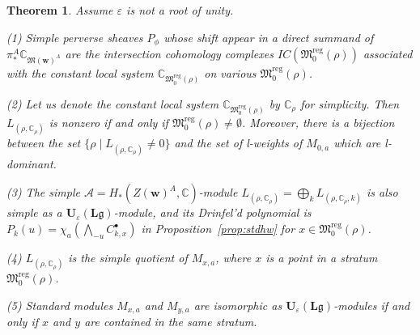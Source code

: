\documentclass[12pt]{amsart}
\def\Bbb{\mathbb}
\def\frak{\mathfrak}
\newcommand{\rom}{\textup}
\newtheorem{Theorem}[equation]{Theorem}
\theoremstyle{definition}
\theoremstyle{remark}
\numberwithin{equation}{subsection}
\newcommand{\propref}[1]{Proposition~\ref{#1}}
\newcommand{\C}{{\Bbb C}}
\newcommand{\M}{{\frak M}} %
\newcommand{\Mreg}{{\frak M_0^{\operatorname{reg}}}}
\newcommand{\bw}{{\mathbf w}} %
\newcommand{\Ule}{{\mathbf U}_{\varepsilon}({\mathbf L}\mathfrak g)}
\newcommand{\Wedge}{{\textstyle \bigwedge}}
\begin{document}
\begin{Theorem}\label{thm:std_decomp}
Assume $\varepsilon$ is not a root of unity.

\rom{(1)} Simple perverse sheaves $P_{\phi}$ whose shift appear in a
direct summand of $\pi^A_*\C_{\M(\bw)^A}$ are the intersection
cohomology complexes $IC(\Mreg(\rho))$
associated with the constant local system $\C_{\Mreg(\rho)}$ on various
$\Mreg(\rho)$.

\rom{(2)} Let us denote the constant local system $\C_{\Mreg(\rho)}$
by $\C_\rho$ for simplicity.
Then $L_{(\rho,\C_\rho)}$ is nonzero if and only if
$\Mreg(\rho)\neq\emptyset$. Moreover, there is a bijection between
%
the set $\{\rho\mid L_{(\rho,\C_{\rho})}\neq 0\}$
and
%
the set of {\it l\/}-weights of $M_{0,a}$ which are {\it l\/}-dominant.

\rom{(3)} The simple $\mathcal A = H_*(Z(\bw)^A,\C)$-module 
$L_{(\rho,\C_\rho)} = \bigoplus_k L_{(\rho,\C_\rho,k)}$
is also simple as a $\Ule$-module, and its Drinfel'd
polynomial is
$P_k(u) = \chi_a\left(\Wedge_{-u} C_{k,x}^\bullet\right)$
in \propref{prop:stdhw} for $x\in \Mreg(\rho)$.

\rom{(4)} $L_{(\rho,\C_\rho)}$ is the simple quotient of $M_{x,a}$,
where $x$ is a point in a stratum $\Mreg(\rho)$.


\rom{(5)} Standard modules $M_{x,a}$ and $M_{y,a}$ are isomorphic as
$\Ule$-modules if and only if $x$ and $y$ are contained in the same
stratum.
\end{Theorem}
\end{document}
